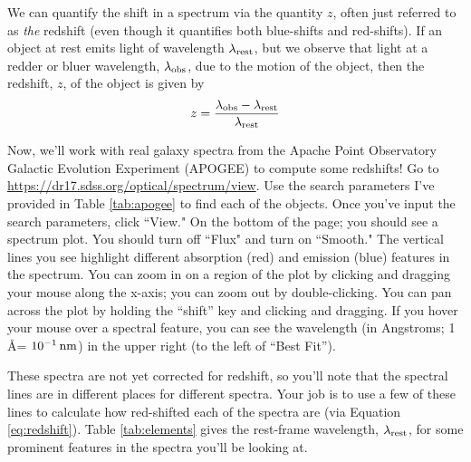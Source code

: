 \documentclass[11pt]{article}
\begin{document}
\medskip
We can quantify the shift in a spectrum via the quantity $z$, often just referred to as \emph{the} redshift (even though it quantifies both blue-shifts and red-shifts). If an object at rest emits light of wavelength $\lambda_{\rm rest}$, but we observe that light at a redder or bluer wavelength, $\lambda_{\rm obs}$, due to the motion of the object, then the redshift, $z$, of the object is given by
\begin{equation} \label{eq:redshift}
    z = \frac{\lambda_{\rm obs}-\lambda_{\rm rest}}{\lambda_{\rm rest}}
\end{equation}
\noindent

\medskip \noindent
Now, we'll work with real galaxy spectra from the Apache Point Observatory Galactic Evolution Experiment (APOGEE) to compute some redshifts! Go to \url{https://dr17.sdss.org/optical/spectrum/view}. Use the search parameters I've provided in Table \ref{tab:apogee} to find each of the objects. Once you've input the search parameters, click ``View." On the bottom of the page; you should see a spectrum plot. You should turn off ``Flux" and turn on ``Smooth." The vertical lines you see highlight different absorption (red) and emission (blue) features in the spectrum. You can zoom in on a region of the plot by clicking and dragging your mouse along the x-axis; you can zoom out by double-clicking. You can pan across the plot by holding the ``shift'' key and clicking and dragging. If you hover your mouse over a spectral feature, you can see the wavelength (in Angstroms; 1 \AA = $10^{-1} \, {\rm nm}$) in the upper right (to the left of ``Best Fit'').

\medskip 
These spectra are not yet corrected for redshift, so you'll note that the spectral lines are in different places for different spectra. Your job is to use a few of these lines to calculate how red-shifted each of the spectra are (via Equation \ref{eq:redshift}). Table \ref{tab:elements} gives the rest-frame wavelength, $\lambda_{\rm rest}$, for some prominent features in the spectra you'll be looking at. 
\end{document}
